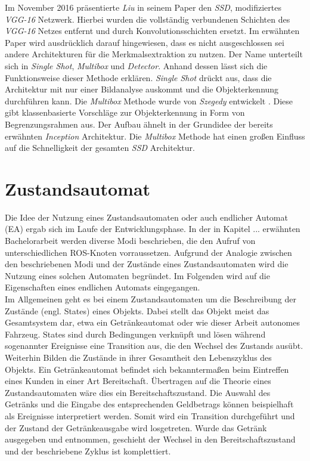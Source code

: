 		Im November 2016 präsentierte \textit{Liu} in seinem Paper den \textit{SSD}, modifiziertes \textit{VGG-16} Netzwerk. Hierbei wurden die vollständig verbundenen Schichten des \textit{VGG-16} Netzes entfernt und durch Konvolutionsschichten ersetzt. Im erwähnten Paper wird ausdrücklich darauf hingewiesen, dass es nicht ausgeschlossen sei andere Architekturen für die Merkmalsextraktion zu nutzen. Der Name unterteilt sich in \textit{Single Shot}, \textit{Multibox} und \textit{Detector}. Anhand dessen lässt sich die Funktionsweise dieser Methode erklären. \textit{Single Shot} drückt aus, dass die Architektur mit nur einer Bildanalyse auskommt und die Objekterkennung durchführen kann. Die \textit{Multibox} Methode wurde von \textit{Szegedy} entwickelt \cite{multibox}. Diese gibt klassenbasierte Vorschläge zur Objekterkennung in Form von Begrenzungsrahmen aus. Der Aufbau ähnelt in der Grundidee der bereits erwähnten \textit{Inception} Architektur. Die \textit{Multibox} Methode hat einen großen Einfluss auf die Schnelligkeit der gesamten \textit{SSD} Architektur. 
		
		
		
		
		  			
	

			
	\section{Zustandsautomat}
	\label{sec: Zustandautomat}
	Die Idee der Nutzung eines Zustandsautomaten oder auch endlicher Automat (EA) ergab sich im Laufe der Entwicklungsphase. In der in Kapitel ... erwähnten Bachelorarbeit werden diverse Modi beschrieben, die den Aufruf von unterschiedlichen ROS-Knoten vorraussetzen. Aufgrund der Analogie zwischen den beschriebenen Modi und der Zustände eines Zustandsautomaten wird die Nutzung eines solchen Automaten begründet. Im Folgenden wird auf die Eigenschaften eines endlichen Automats eingegangen.\\
	
	Im Allgemeinen geht es bei einem Zustandsautomaten um die Beschreibung der Zustände (engl. States) eines Objekts. Dabei stellt das Objekt meist das Gesamtsystem dar, etwa ein Getränkeautomat oder wie dieser Arbeit autonomes Fahrzeug. States sind durch Bedingungen verknüpft und lösen während sogenannter Ereignisse eine Transition aus, die den Wechsel des Zustands ausübt. Weiterhin Bilden die Zustände in ihrer Gesamtheit den Lebenszyklus des Objekts. Ein Getränkeautomat befindet sich bekanntermaßen beim Eintreffen eines Kunden in einer Art Bereitschaft. Übertragen auf die Theorie eines Zustandsautomaten wäre dies ein Bereitschaftszustand. Die Auswahl des Getränks und die Eingabe des entsprechenden Geldbetrags können beispielhaft als Ereignisse interpretiert werden. Somit wird ein Transition durchgeführt und der Zustand der Getränkeausgabe wird losgetreten. Wurde das Getränk ausgegeben und entnommen, geschieht der Wechsel in den Bereitschaftszustand und der beschriebene Zyklus ist komplettiert.\\
	
